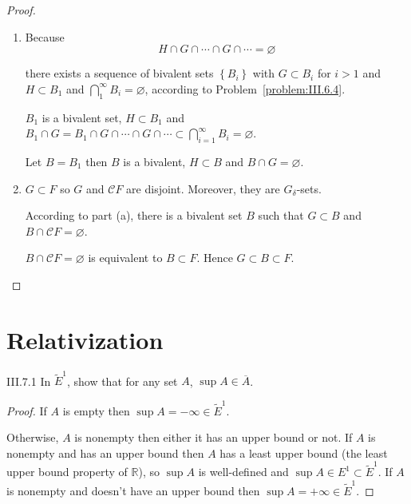 \begin{proof}
    \begin{enumerate}[label={(\alph*)}]
        \item Because
              \[
                  H \cap G \cap \cdots \cap G \cap \cdots = \varnothing
              \]

              there exists a sequence of bivalent sets \( \left\{ B_{i} \right\} \) with \(G \subset B_{i}\) for \(i>1\) and \(H \subset B_{1}\) and \( \bigcap^{\infty}_{1} B_{i} = \varnothing \), according to Problem~\ref{problem:III.6.4}.

              \(B_{1}\) is a bivalent set, \( H \subset B_{1} \) and \( B_{1} \cap G = B_{1} \cap G \cap \cdots \cap G \cap \cdots \subset \bigcap^{\infty}_{i=1} B_{i} = \varnothing \).

              Let \( B = B_{1} \) then \(B\) is a bivalent, \( H \subset B \) and \( B \cap G = \varnothing \).
        \item \( G \subset F \) so \( G \) and \( \mathscr{C}F \) are disjoint. Moreover, they are \( G_{\delta} \)-sets.

              According to part (a), there is a bivalent set \(B\) such that \( G \subset B \) and \( B \cap \mathscr{C}F = \varnothing \).

              \( B \cap \mathscr{C}F = \varnothing \) is equivalent to \( B \subset F \). Hence \( G \subset B \subset F \).
    \end{enumerate}
\end{proof}

\section{Relativization}

\begin{problem}{III.7.1}
In \( {\tilde{E}}^{1} \), show that for any set \(A\), \(\sup A \in \overline{A}\).
\end{problem}

\begin{proof}
    If \( A \) is empty then \( \sup A = -\infty \in \tilde{E}^{1} \).

    Otherwise, \( A \) is nonempty then either it has an upper bound or not. If \(A\) is nonempty and has an upper bound then \(A\) has a least upper bound (the least upper bound property of \(\mathbb{R}\)), so \( \sup A \) is well-defined and \( \sup A \in E^{1} \subset \tilde{E}^{1} \). If \( A \) is nonempty and doesn't have an upper bound then \( \sup A = +\infty \in \tilde{E}^{1} \).
\end{proof}

